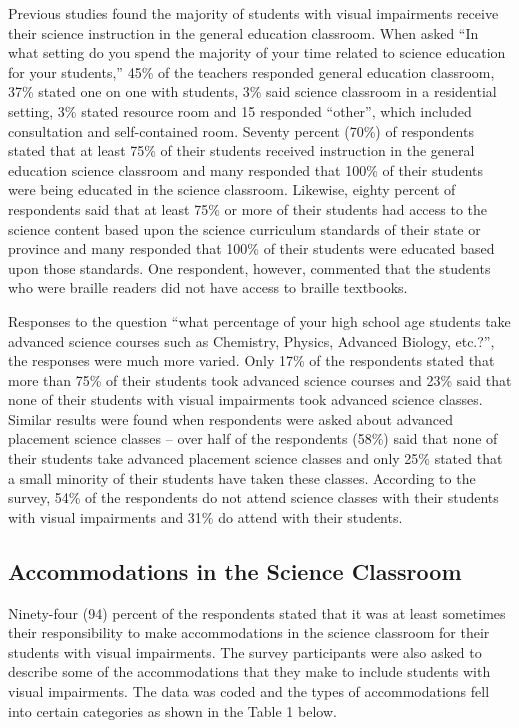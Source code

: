 \documentclass[11.5pt]{sig-alternate} %
\begin{document}
\begin{large}
Previous studies found the majority of students with visual impairments receive their science instruction in the general education classroom.  When asked “In what setting do you spend the majority of your time related to science education for your students,” 45\% of the teachers responded general education classroom, 37\% stated one on one with students, 3\% said science classroom in a residential setting, 3\% stated resource room and 15 responded “other”, which included consultation and self-contained room.  Seventy percent (70\%) of respondents stated that at least 75\% of their students received instruction in the general education science classroom and many responded that 100\% of their students were being educated in the science classroom.  Likewise, eighty percent of respondents said that at least 75\% or more of their students had access to the science content based upon the science curriculum standards of their state or province and many responded that 100\% of their students were educated based upon those standards.  One respondent, however, commented that the students who were braille readers did not have access to braille textbooks. 

Responses to the question “what percentage of your high school age students take advanced science courses such as Chemistry, Physics, Advanced Biology, etc.?”, the responses were much more varied.  Only 17\% of the respondents stated that more than 75\% of their students took advanced science courses and 23\% said that none of their students with visual impairments took advanced science classes.  Similar results were found when respondents were asked about advanced placement science classes – over half of the respondents (58\%) said that none of their students take advanced placement science classes and only 25\% stated that a small minority of their students have taken these classes.  According to the survey, 54\% of the respondents do not attend science classes with their students with visual impairments and 31\% do attend with their students.  

\subsection*{Accommodations in the Science Classroom}

Ninety-four (94) percent of the respondents stated that it was at least sometimes their responsibility to make accommodations in the science classroom for their students with visual impairments.  The survey participants were also asked to describe some of the accommodations that they make to include students with visual impairments.  The data was coded and the types of accommodations fell into certain categories as shown in the Table 1 below.  


\end{large}
\end{document}
